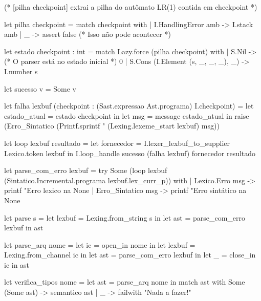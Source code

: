 \documentclass[12pt,a4paper,twoside]{article}
\begin{document}
\begin{terminal}
(* [pilha checkpoint] extrai a pilha do autômato LR(1) contida em checkpoint *)

let pilha checkpoint =
  match checkpoint with
  | I.HandlingError amb -> I.stack amb
  | _ -> assert false (* Isso não pode acontecer *)

let estado checkpoint : int =
  match Lazy.force (pilha checkpoint) with
  | S.Nil -> (* O parser está no estado inicial *)
     0
  | S.Cons (I.Element (s, _, _, _), _) ->
     I.number s

let sucesso v = Some v

let falha lexbuf (checkpoint : (Sast.expressao Ast.programa) I.checkpoint) =
  let estado_atual = estado checkpoint in
  let msg = message estado_atual in
  raise (Erro_Sintatico (Printf.sprintf "%
                                      (Lexing.lexeme_start lexbuf) msg))

let loop lexbuf resultado =
  let fornecedor = I.lexer_lexbuf_to_supplier Lexico.token lexbuf in
  I.loop_handle sucesso (falha lexbuf) fornecedor resultado


let parse_com_erro lexbuf =
  try
    Some (loop lexbuf (Sintatico.Incremental.programa lexbuf.lex_curr_p))
  with
  | Lexico.Erro msg ->
     printf "Erro lexico na %
     None
  | Erro_Sintatico msg ->
     printf "Erro sintático na %
     None

let parse s =
  let lexbuf = Lexing.from_string s in
  let ast = parse_com_erro lexbuf in
  ast

let parse_arq nome =
  let ic = open_in nome in
  let lexbuf = Lexing.from_channel ic in
  let ast = parse_com_erro lexbuf in
  let _ = close_in ic in
  ast

let verifica_tipos nome =
  let ast = parse_arq nome in
  match ast with
    Some (Some ast) -> semantico ast
  | _ -> failwith "Nada a fazer!\n"
\end{terminal}
\end{document}
